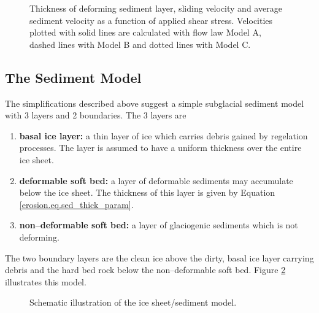 \begin{figure}[htbp]
  \centering
  \caption{Thickness of deforming sediment layer, sliding velocity and average sediment velocity as a function of applied shear stress. Velocities plotted with solid lines are calculated with flow law Model A, dashed lines with Model B and dotted lines with Model C.}
  \label{erosion.fig.sed_velos}
\end{figure}

\subsection{The Sediment Model}
The simplifications described above suggest a simple subglacial sediment model with 3 layers and 2 boundaries. The 3 layers are
\begin{enumerate}
\item \textbf{basal ice layer:} a thin layer of ice which carries debris gained
by regelation processes. The layer is assumed to have a uniform thickness over the entire ice sheet.
\item \textbf{deformable soft bed:} a layer of deformable sediments may accumulate below the ice sheet. The thickness of this layer is given by Equation \eqref{erosion.eq.sed_thick_param}.
\item \textbf{non--deformable soft bed:} a layer of glaciogenic sediments which is not deforming.
\end{enumerate}
The two boundary layers are the clean ice above the dirty, basal ice layer carrying debris and the hard bed rock below the non--deformable soft bed. Figure \ref{erosion.fig.ice_sed_model} illustrates this model.

\begin{figure}[htbp]
  \centering
  
  \caption{Schematic illustration of the ice sheet/sediment model.}
  \label{erosion.fig.ice_sed_model}
\end{figure}

